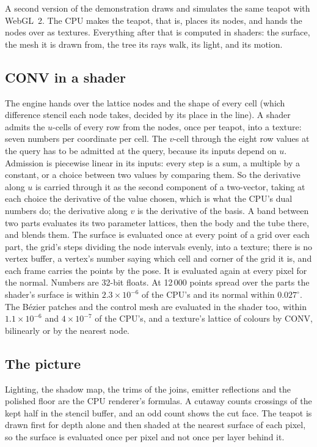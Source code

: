 \documentclass[journal]{IEEEtran}
\begin{document}
A second version of the demonstration draws and simulates the same
teapot with WebGL~2. The CPU makes the teapot, that is, places its
nodes, and hands the nodes over as textures. Everything after that is
computed in shaders: the surface, the mesh it is drawn from, the tree
its rays walk, its light, and its motion.

\subsection{CONV in a shader}

The engine hands over the lattice nodes and the shape of every cell
(which difference stencil each node takes, decided by its place in the
line). A shader admits the $u$-cells of every row from the nodes, once
per teapot, into a texture: seven numbers per coordinate per cell. The $v$-cell through the eight row values at
the query has to be admitted at the query, because its inputs depend on
$u$. Admission is piecewise linear in its
inputs: every step is a sum, a multiple by a constant, or a choice
between two values by comparing them. So the derivative along $u$ is
carried through it as the second component of a two-vector, taking at
each choice the derivative of the value chosen, which is what the CPU's
dual numbers do; the derivative along $v$ is the derivative of the
basis. A band between two parts evaluates its two parameter lattices,
then the body and the tube there, and blends them. The surface is
evaluated once at every point of a grid over each part, the grid's
steps dividing the node intervals evenly, into a texture; there is no
vertex buffer, a vertex's number saying which cell and corner of the
grid it is, and each frame carries the points by the pose. It is
evaluated again at every pixel for the normal. Numbers are 32-bit floats. At 12\,000
points spread over the parts the shader's surface is within
$2.3\times10^{-6}$ of the CPU's and its normal within $0.027^\circ$. The
B\'ezier patches and the control mesh are evaluated in the shader too,
within $1.1\times10^{-6}$ and $4\times10^{-7}$ of the CPU's, and a
texture's lattice of colours by CONV, bilinearly or by the nearest node.

\subsection{The picture}

Lighting, the shadow map, the trims of the joins, emitter reflections
and the polished floor are the CPU renderer's formulas. A cutaway counts
crossings of the kept half in the stencil buffer, and an odd count shows
the cut face. The teapot is drawn first for depth alone and then shaded
at the nearest surface of each pixel, so the surface is evaluated once
per pixel and not once per layer behind it.
\end{document}
